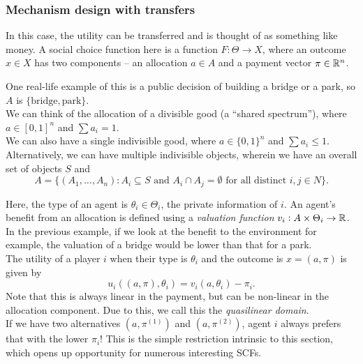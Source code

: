	\subsubsection{Mechanism design with transfers}
		\label{sec: mechanism design w transfers}

		In this case, the utility can be transferred and is thought of as something like money. A social choice function here is a function $F : \Theta \to X$, where an outcome $x \in X$ has two components -- an allocation $a \in A$ and a payment vector $\pi \in \mathbb{R}^n$.

		\begin{fex}
			\label{ex: payment irl examples}
			One real-life example of this is a public decision of building a bridge or a park, so $A$ is $\{\text{bridge},\text{park}\}$.\\
			We can think of the allocation of a divisible good (a ``shared spectrum''), where $a \in [0,1]^n$ and $\sum a_i = 1$.\\
			We can also have a single indivisible good, where $a \in \{0,1\}^n$ and $\sum a_i \le 1$.\\
			Alternatively, we can have multiple indivisible objects, wherein we have an overall set of objects $S$ and
			\[ A = \{ (A_1,\ldots,A_n) : A_i \subseteq S\text{ and }A_i \cap A_j = \emptyset \text{ for all distinct $i,j \in N$} \}. \]
		\end{fex}

		Here, the type of an agent is $\theta_i \in \Theta_i$, the private information of $i$. An agent's benefit from an allocation is defined using a \emph{valuation function} $v_i : A \times \Theta_i \to \mathbb{R}$.\\
		In the previous example, if we look at the benefit to the environment for example, the valuation of a bridge would be lower than that for a park.\\

		The utility of a player $i$ when their type is $\theta_i$ and the outcome is $x = (a,\pi)$ is given by
		\[ u_i( (a,\pi) , \theta_i ) = v_i(a,\theta_i) - \pi_i. \]
		Note that this is always linear in the payment, but can be non-linear in the allocation component. Due to this, we call this the \emph{quasilinear domain}. \\
		If we have two alternatives $(a,\pi^{(1)})$ and $(a,\pi^{(2)})$, agent $i$ always prefers that with the lower $\pi_i$! This is the simple restriction intrinsic to this section, which opens up opportunity for numerous interesting SCFs.\\

